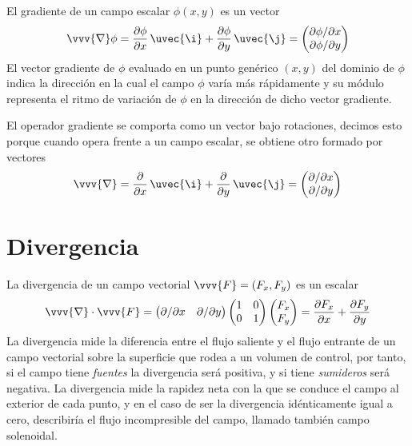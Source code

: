 El gradiente de un campo escalar $\phi(x,y)$ es un vector
\begin{equation}
  \vvv{\nabla}\phi
  = \dfrac{\partial \phi}{\partial x}\,\uvec{\i}
  + \dfrac{\partial \phi}{\partial y}\,\uvec{\j}
  = \begin{pmatrix}
    \partial \phi/\partial x\\
    \partial \phi/\partial y
    \end{pmatrix}
\end{equation}
El vector gradiente de $\phi$ evaluado en un punto genérico $(x,y)$ del dominio de $\phi$
indica la dirección en la cual el campo $\phi$ varía más rápidamente y su módulo
representa el ritmo de variación de $\phi$ en la dirección de dicho vector gradiente.

El operador gradiente se comporta como un vector bajo rotaciones, decimos esto porque
cuando opera frente a un campo escalar, se obtiene otro formado por vectores
\begin{equation}
  \vvv{\nabla}
  = \dfrac{\partial}{\partial x}\,\uvec{\i}
  + \dfrac{\partial}{\partial y}\,\uvec{\j}
  = \begin{pmatrix}
    \partial/\partial x\\
    \partial/\partial y
    \end{pmatrix}
\end{equation}

\section{Divergencia}
La divergencia de un campo vectorial $\vvv{F}=(F_x, F_y)$ es un escalar
\begin{equation}\label{eq:R2-divergencia-cartesianas}
  \vvv{\nabla}\cdot\vvv{F}
  = \begin{pmatrix}
    \partial/\partial x & \partial/\partial y      
  \end{pmatrix}
  \begin{pmatrix}
    1 & 0\\
    0 & 1
  \end{pmatrix}
  \begin{pmatrix}
    F_x\\
    F_y
  \end{pmatrix}
  = \dfrac{\partial F_x}{\partial x}
  + \dfrac{\partial F_y}{\partial y}
\end{equation}
La divergencia mide la diferencia entre el flujo saliente y el flujo entrante de un
campo vectorial sobre la superficie que rodea a un volumen de control, por tanto, si el
campo tiene \emph{fuentes} la divergencia será positiva, y si tiene \emph{sumideros}
será negativa. La divergencia mide la rapidez neta con la que se conduce el campo al
exterior de cada punto, y en el caso de ser la divergencia idénticamente igual a cero,
describiría el flujo incompresible del campo, llamado también campo solenoidal.

